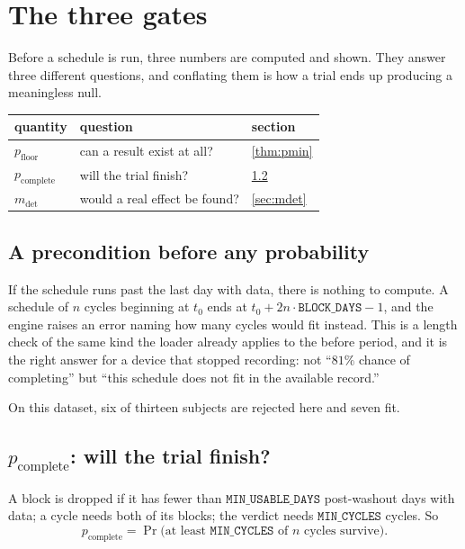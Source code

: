 \documentclass{article}
\theoremstyle{plain}
\theoremstyle{definition}
\theoremstyle{remark}
\numberwithin{equation}{section}
\begin{document}
\section{The three gates}
\label{sec:gates}

Before a schedule is run, three numbers are computed and shown. They answer
three different questions, and conflating them is how a trial ends up producing
a meaningless null.

\begin{center}
\begin{tabular}{lll}
quantity & question & section \\
\hline
$p_{\mathrm{floor}}$ & can a result exist at all? & \ref{thm:pmin} \\
$p_{\mathrm{complete}}$ & will the trial finish? & \ref{sec:pcomplete} \\
$m_{\mathrm{det}}$ & would a real effect be found? & \ref{sec:mdet} \\
\end{tabular}
\end{center}

\subsection{A precondition before any probability}
\label{sec:fit}

If the schedule runs past the last day with data, there is nothing to compute.
A schedule of $n$ cycles beginning at $t_0$ ends at
$t_0 + 2n\cdot\texttt{BLOCK\_DAYS} - 1$, and the engine raises an error naming
how many cycles would fit instead. This is a length check of the same kind the
loader already applies to the before period, and it is the right answer for a
device that stopped recording: not ``$81\%$ chance of completing'' but ``this
schedule does not fit in the available record.''

On this dataset, six of thirteen subjects are rejected here and seven fit.

\subsection{$p_{\mathrm{complete}}$: will the trial finish?}
\label{sec:pcomplete}

A block is dropped if it has fewer than $\texttt{MIN\_USABLE\_DAYS}$
post-washout days with data; a cycle needs both of its blocks; the verdict needs
$\texttt{MIN\_CYCLES}$ cycles. So
\[
  p_{\mathrm{complete}} = \Pr\big(\text{at least } \texttt{MIN\_CYCLES}
  \text{ of } n \text{ cycles survive}\big).
\]
\end{document}
